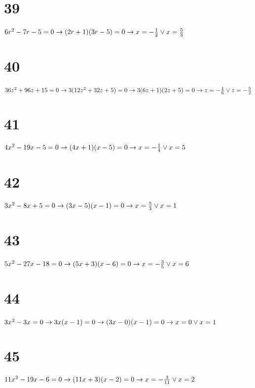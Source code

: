 \documentclass{article}
\theoremstyle{definition}
\begin{document}
\section*{39}
$6r^2-7r-5=0\newline\rightarrow (2r+1)(3r-5)=0\newline\rightarrow x=-\frac{1}{2}\vee x=\frac{5}{3}$

\section*{40}
$36z^2+96z+15=0\newline\rightarrow 3(12z^2+32z+5)=0\newline\rightarrow 3(6z+1)(2z+5)=0\newline\rightarrow z=-\frac{1}{6}\vee z=-\frac{5}{2}$

\section*{41}
$4x^2-19x-5=0\newline\rightarrow (4x+1)(x-5)=0\newline\rightarrow x=-\frac{1}{4}\vee x=5$

\section*{42}
$3x^2-8x+5=0\newline\rightarrow (3x-5)(x-1)=0\newline\rightarrow x=\frac{5}{3}\vee x=1$

\section*{43}
$5x^2-27x-18=0\newline\rightarrow (5x+3)(x-6)=0\newline\rightarrow x=-\frac{3}{5}\vee x=6$

\section*{44}
$3x^2-3x=0\newline\rightarrow 3x(x-1)=0\newline\rightarrow (3x-0)(x-1)=0\newline\rightarrow x=0\vee x=1$ 

\section*{45}
$11x^2-19x-6=0\newline\rightarrow (11x+3)(x-2)=0\newline\rightarrow x=-\frac{3}{11}\vee x=2$
\end{document}
